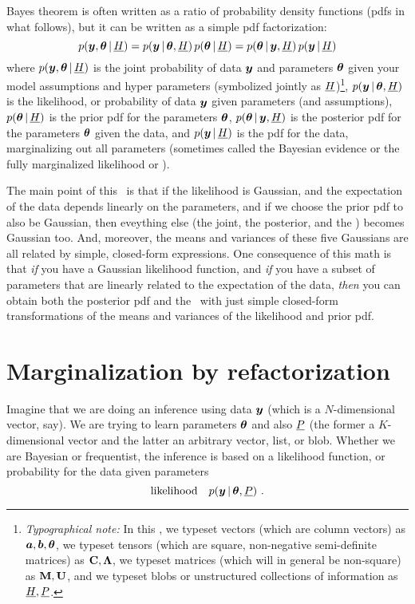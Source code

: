 Bayes theorem is often written as a ratio of probability density
functions (pdfs in what follows), but it can be written as a simple
pdf factorization:
\begin{equation}
p(\boldsymbol{y},\boldsymbol{\theta}\,|\,\underline{H}) = p(\boldsymbol{y}\,|\,\boldsymbol{\theta},\underline{H})\,p(\boldsymbol{\theta}\,|\,\underline{H}) = p(\boldsymbol{\theta}\,|\,\boldsymbol{y},\underline{H})\,p(\boldsymbol{y}\,|\,\underline{H})
\end{equation}
where
$p(\boldsymbol{y},\boldsymbol{\theta}\,|\,\underline{H})$ is the joint probability of data $\boldsymbol{y}$ and
parameters $\boldsymbol{\theta}$ given your model assumptions and hyper parameters
(symbolized jointly as $\underline{H}$)\footnote{%
\textsl{Typographical note:} In this \documentname, we
typeset vectors (which are column vectors) as $\boldsymbol{a}, \boldsymbol{b}, \boldsymbol{\theta}$, we typeset tensors (which
are square, non-negative semi-definite matrices) as $\mathbf{C}, \mathbf{\Lambda}$,
we typeset matrices (which will in general be non-square) as $\mathbf{M}, \mathbf{U}$,
and we typeset blobs or unstructured
collections of information as $\underline{H}, \underline{P}$.},
$p(\boldsymbol{y}\,|\,\boldsymbol{\theta},\underline{H})$ is the likelihood, or probability of data $\boldsymbol{y}$
given parameters (and assumptions),
$p(\boldsymbol{\theta}\,|\,\underline{H})$ is the prior pdf for the parameters $\boldsymbol{\theta}$,
$p(\boldsymbol{\theta}\,|\,\boldsymbol{y},\underline{H})$ is the posterior pdf for the parameters $\boldsymbol{\theta}$
given the data,
and
$p(\boldsymbol{y}\,|\,\underline{H})$ is the pdf for the data, marginalizing out all
parameters (sometimes called the Bayesian evidence or the fully
marginalized likelihood or \FML).

The main point of this \documentname\ is that if the likelihood is
Gaussian, and the expectation of the data depends linearly on the
parameters, and if we choose the prior pdf to also be Gaussian, then
eveything else (the joint, the posterior, and the \FML) becomes
Gaussian too.
And, moreover, the means and variances of these five Gaussians are all
related by simple, closed-form expressions.
One consequence of this math is that \emph{if} you have a Gaussian
likelihood function, and \emph{if} you have a subset of parameters
that are linearly related to the expectation of the data, \emph{then}
you can obtain both the posterior pdf and the \FML\ with just simple
closed-form transformations of the means and variances of the
likelihood and prior pdf.

\section{Marginalization by refactorization}

Imagine that we are doing an inference using data $\boldsymbol{y}$ (which is a
$N$-dimensional vector, say).
We are trying to learn parameters $\boldsymbol{\theta}$ and also $\underline{P}$ (the former a
$K$-dimensional vector and the latter an arbitrary vector, list,
or blob.
Whether we are Bayesian or frequentist, the inference is based on
a likelihood function, or probability for the data given parameters
\begin{equation}
\mbox{likelihood} \quad p(\boldsymbol{y}\,|\,\boldsymbol{\theta},\underline{P})
~ .
\end{equation}

